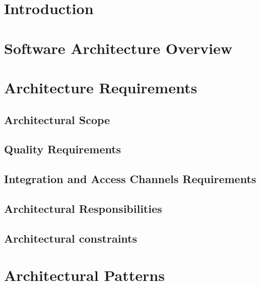 \documentclass[a4paper,12pt]{article}
\begin{document}
	\section{Introduction}	
	
	
	
	\section{Software Architecture Overview}
	
	
	\section{Architecture Requirements}
	
	
		\subsection{Architectural Scope}
		

		\subsection{Quality Requirements}
		
			
		\subsection{Integration and Access Channels Requirements}
		
		
		\subsection{Architectural Responsibilities}
		
					
		\subsection{Architectural constraints}
		
	
	\section{Architectural Patterns}
	
	
\end{document}
